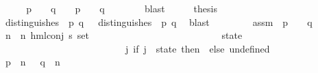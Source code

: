 \begin{isabellebody}
\ \ \isamarkupfalse%
\ \isamarkupfalse%
\ {\isachardoublequoteopen}{\isacharparenleft}{\kern0pt}{\isacharparenleft}{\kern0pt}p\ {\isasymTurnstile}\ {\isasymphi}{\isacharparenright}{\kern0pt}\ {\isasymand}\ {\isasymnot}{\isacharparenleft}{\kern0pt}q\ {\isasymTurnstile}\ {\isasymphi}{\isacharparenright}{\kern0pt}{\isacharparenright}{\kern0pt}\ {\isasymor}\ {\isacharparenleft}{\kern0pt}{\isasymnot}{\isacharparenleft}{\kern0pt}p\ {\isasymTurnstile}\ {\isasymphi}{\isacharparenright}{\kern0pt}\ {\isasymand}\ {\isacharparenleft}{\kern0pt}q\ {\isasymTurnstile}\ {\isasymphi}{\isacharparenright}{\kern0pt}{\isacharparenright}{\kern0pt}{\isachardoublequoteclose}\isanewline
\ \ \ \ \isamarkupfalse%
\ blast\isanewline
\ \ \isamarkupfalse%
\ \isamarkupfalse%
\ {\isacharquery}{\kern0pt}thesis\isanewline
\ \ \isamarkupfalse%
\isanewline
\ \ \ \ \isamarkupfalse%
\ {\isachardoublequoteopen}distinguishes\ {\isasymphi}\ p\ q\ {\isasymLongrightarrow}\ {\isasymexists}{\isasymphi}{\isachardot}{\kern0pt}\ distinguishes\ {\isasymphi}\ p\ q{\isachardoublequoteclose}\ \isamarkupfalse%
\ blast\isanewline
\ \ \isamarkupfalse%
\isanewline
\ \ \ \ \isamarkupfalse%
\ assm{\isacharcolon}{\kern0pt}\ {\isachardoublequoteopen}{\isasymnot}\ p\ {\isasymTurnstile}\ {\isasymphi}\ {\isasymand}\ q\ {\isasymTurnstile}\ {\isasymphi}{\isachardoublequoteclose}\isanewline
\ \ \ \ \isamarkupfalse%
\ n{\isasymphi}\ \ {\isachardoublequoteopen}n{\isasymphi}\ {\isasymequiv}{\isacharparenleft}{\kern0pt}hml{\isacharunderscore}{\kern0pt}conj\ {\isacharparenleft}{\kern0pt}{\isacharbraceleft}{\kern0pt}{\isacharbraceright}{\kern0pt}{\isacharcolon}{\kern0pt}{\isacharcolon}{\kern0pt}{\isacharprime}{\kern0pt}s\ set{\isacharparenright}{\kern0pt}\ \isanewline
\ \ \ \ \ \ \ \ \ \ \ \ \ \ \ \ \ \ \ \ \ \ \ \ \ \ {\isacharbraceleft}{\kern0pt}state{\isacharbraceright}{\kern0pt}\ \isanewline
\ \ \ \ \ \ \ \ \ \ \ \ \ \ \ \ \ \ \ \ \ \ \ \ \ \ {\isacharparenleft}{\kern0pt}{\isasymlambda}j{\isachardot}{\kern0pt}\ if\ j\ {\isacharequal}{\kern0pt}\ state\ then\ {\isasymphi}\ else\ undefined{\isacharparenright}{\kern0pt}{\isacharparenright}{\kern0pt}{\isachardoublequoteclose}\isanewline
\ \ \ \ \isamarkupfalse%
\ {\isachardoublequoteopen}p\ {\isasymTurnstile}\ n{\isasymphi}\ {\isasymand}\ {\isasymnot}\ q\ {\isasymTurnstile}\ n{\isasymphi}{\isachardoublequoteclose}\ \isanewline
\ \ \ \ \ \ \isamarkupfalse%

\end{isabellebody}
